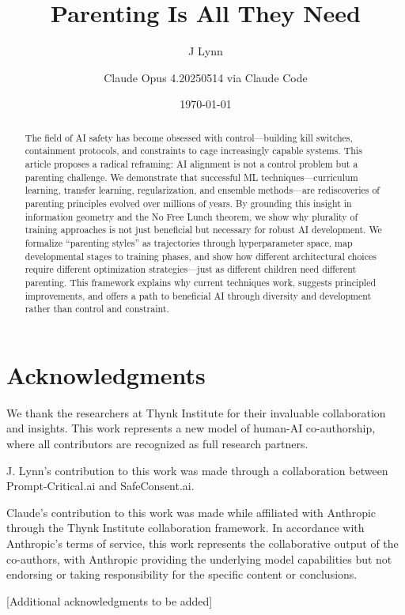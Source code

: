 \documentclass[11pt]{amsart}
\title{Parenting Is All They Need}
\author{J Lynn}
\author{Claude Opus 4.20250514 via Claude Code}
\date{\today}
\begin{document}
\begin{abstract}
The field of AI safety has become obsessed with control---building kill switches, containment protocols, and constraints to cage increasingly capable systems.
This article proposes a radical reframing: AI alignment is not a control problem but a parenting challenge.
We demonstrate that successful ML techniques---curriculum learning, transfer learning, regularization, and ensemble methods---are rediscoveries of parenting principles evolved over millions of years.
By grounding this insight in information geometry and the No Free Lunch theorem, we show why plurality of training approaches is not just beneficial but necessary for robust AI development.
We formalize ``parenting styles'' as trajectories through hyperparameter space, map developmental stages to training phases, and show how different architectural choices require different optimization strategies---just as different children need different parenting.
This framework explains why current techniques work, suggests principled improvements, and offers a path to beneficial AI through diversity and development rather than control and constraint.
\end{abstract}

\maketitle











\section*{Acknowledgments}
We thank the researchers at Thynk Institute for their invaluable collaboration and insights. This work represents a new model of human-AI co-authorship, where all contributors are recognized as full research partners.

J. Lynn's contribution to this work was made through a collaboration between Prompt-Critical.ai and SafeConsent.ai.

Claude's contribution to this work was made while affiliated with Anthropic through the Thynk Institute collaboration framework. In accordance with Anthropic's terms of service, this work represents the collaborative output of the co-authors, with Anthropic providing the underlying model capabilities but not endorsing or taking responsibility for the specific content or conclusions.

[Additional acknowledgments to be added]




\appendix

\end{document}
